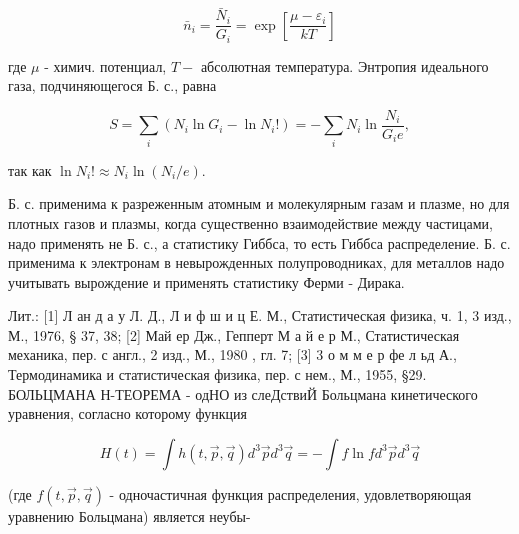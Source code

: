 \documentclass[10pt]{article}
\begin{document}
\[

\bar{n}_{i}=\frac{\bar{N}_{i}}{G_{i}}=\exp \left[\frac{\mu-\varepsilon_{i}}{k T}\right]

\]



где $\mu$ - химич. потенциал, $T-$ абсолютная температура. Энтропия идеального газа, подчиняющегося Б. с., равна



\[

S=\sum_{i}\left(N_{i} \ln G_{i}-\ln N_{i} !\right)=-\sum_{i} N_{i} \ln \frac{N_{i}}{G_{i} e},

\]



так как $\ln N_{i} ! \approx N_{i} \ln \left(N_{i} / e\right)$.



Б. с. применима к разреженным атомным и молекулярным газам и плазме, но для плотных газов и плазмы, когда существенно взаимодействие между частицами, надо применять не Б. с., а статистику Гиббса, то есть Гиббса распределение. Б. с. применима к электронам в невырожденных полупроводниках, для металлов надо учитывать вырождение и применять статистику Ферми - Дирака.



Лит.: [1] Л ан д а у Л. Д., Л и ф ш и ц Е. М., Статистическая физика, ч. 1, 3 изд., М., 1976, § 37, 38; [2] Май ер Дж., Гепперт М а й е р М., Статистическая механика, пер. с англ., 2 изд., М., 1980 , гл. 7; [3] 3 о м м е р фе л ьд А., Термодинамика и статистическая физика, пер. с нем., М., 1955, §29. БОЛЬЦМАНА Н-ТЕОРЕМА - одНО из слеДствиЙ Больцмана кинетического уравнения, согласно которому функция



\[

H(t)=\int h(t, \vec{p}, \vec{q}) d^{3} \vec{p} d^{3} \vec{q}=-\int f \ln f d^{3} \vec{p} d^{3} \vec{q}

\]



(где $f(t, \vec{p}, \vec{q})$ - одночастичная функция распределения, удовлетворяющая уравнению Больцмана) является неубы-
\end{document}
